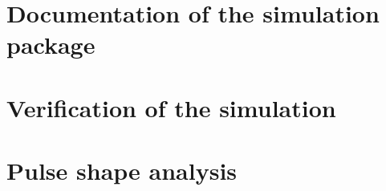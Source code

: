 \documentclass[11pt, a4paper]{article}
\begin{document}
\section{Documentation of the simulation package}
\label{sec:manual}



\section{Verification of the simulation}
\label{sec:verify}


\section{Pulse shape analysis}
\label{sec:physics}


\clearpage
 
\begin{thebibliography}{sotief}


\end{thebibliography}
\end{document}
